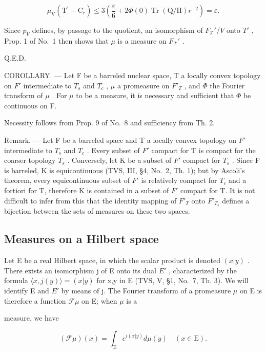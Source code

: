 \[
\mu_ {\mathrm{V}} \left(\mathrm{T} ^ {\prime} - \mathrm{C} _ {r}\right) \leqslant 3 \left(\frac {\varepsilon}{6} + 2 \Phi (0) \operatorname{Tr} (\mathrm{Q} / \mathrm{H}) r ^ {- 2}\right) = \varepsilon .
\]

Since \(p_V\) defines, by passage to the quotient, an isomorphism of \(F_{\mathcal{T}}' / V\) onto \(T'\) , Prop. 1 of No.~1 then shows that \(\mu\) is a measure on \(F_{\mathcal{T}}'\) .

Q.E.D.

COROLLARY. --- Let F be a barreled nuclear space, T a locally convex topology on \(F'\) intermediate to \(T_{s}\) and \(T_{c}\) , \(\mu\) a promeasure on \(F'_{T}\) , and \(\Phi\) the Fourier transform of \(\mu\) . For \(\mu\) to be a measure, it is necessary and sufficient that \(\Phi\) be continuous on F.

Necessity follows from Prop. 9 of No.~8 and sufficiency from Th. 2.

Remark. --- Let F be a barreled space and T a locally convex topology on \(F'\) intermediate to \(T_s\) and \(T_c\) . Every subset of \(F'\) compact for T is compact for the coarser topology \(T_s\) . Conversely, let K be a subset of \(F'\) compact for \(T_s\) . Since F is barreled, K is equicontinuous (TVS, III, §4, No.~2, Th. 1); but by Ascoli's theorem, every equicontinuous subset of \(F'\) is relatively compact for \(T_c\) and a fortiori for T, therefore K is contained in a subset of \(F'\) compact for T. It is not difficult to infer from this that the identity mapping of \(F'_T\) onto \(F'_{T_s}\) defines a bijection between the sets of measures on these two spaces.

\subsection{Measures on a Hilbert space}

Let E be a real Hilbert space, in which the scalar product is denoted \((x|y)\) . There exists an isomorphism j of E onto its dual \(E'\) , characterized by the formula \(\langle x,j(y)\rangle=(x|y)\) for x,y in E (TVS, V, §1, No.~7, Th. 3). We will identify E and \(E'\) by means of j. The Fourier transform of a promeasure \(\mu\) on E is therefore a function \(\mathcal{F}\mu\) on E; when \(\mu\) is a

measure, we have

\[
(\mathcal {F} \mu) (x) = \int_ {\mathrm{E}} e ^ {i (x | y)} d \mu (y) \quad (x \in \mathrm{E}).\tag{64}
\]

